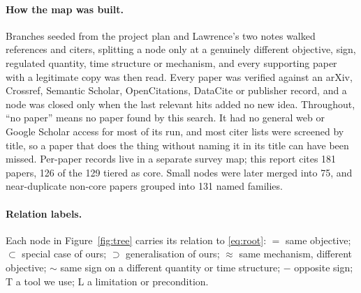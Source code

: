 \documentclass[10pt]{article}
\begin{document}
\paragraph{How the map was built.}
Branches seeded from the project plan and Lawrence's two notes walked references and citers, splitting a node only at a genuinely different objective, sign, regulated quantity, time structure or mechanism, and every supporting paper with a legitimate copy was then read.
Every paper was verified against an arXiv, Crossref, Semantic Scholar, OpenCitations, DataCite or publisher record, and a node was closed only when the last relevant hits added no new idea. Throughout, ``no paper'' means no paper found by this search. It had no general web or Google Scholar access for most of its run, and most citer lists were screened by title, so a paper that does the thing without naming it in its title can have been missed. Per-paper records live in a separate survey map; this report cites 181 papers, 126 of the 129 tiered as core. Small nodes were later merged into 75, and near-duplicate non-core papers grouped into 131 named families.

\paragraph{Relation labels.}
Each node in Figure~\ref{fig:tree} carries its relation to \eqref{eq:root}:
$=$ same objective;
$\subset$ special case of ours;
$\supset$ generalisation of ours;
$\approx$ same mechanism, different objective;
$\sim$ same sign on a different quantity or time structure;
$-$ opposite sign;
T a tool we use;
L a limitation or precondition.
\end{document}
